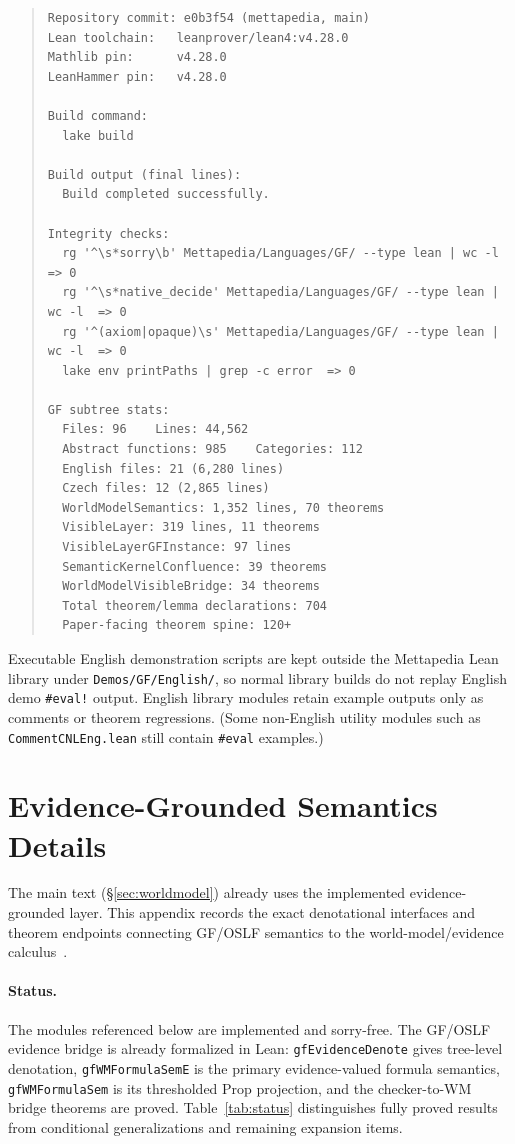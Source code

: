 \documentclass[11pt]{article}
\newcommand{\code}[1]{\texttt{#1}}
\newcommand{\OSLF}{\textup{OSLF}}
\newcommand{\GF}{\textup{GF}}
\begin{document}
\begin{quote}
\small
\begin{verbatim}
Repository commit: e0b3f54 (mettapedia, main)
Lean toolchain:   leanprover/lean4:v4.28.0
Mathlib pin:      v4.28.0
LeanHammer pin:   v4.28.0

Build command:
  lake build

Build output (final lines):
  Build completed successfully.

Integrity checks:
  rg '^\s*sorry\b' Mettapedia/Languages/GF/ --type lean | wc -l  => 0
  rg '^\s*native_decide' Mettapedia/Languages/GF/ --type lean | wc -l  => 0
  rg '^(axiom|opaque)\s' Mettapedia/Languages/GF/ --type lean | wc -l  => 0
  lake env printPaths | grep -c error  => 0

GF subtree stats:
  Files: 96    Lines: 44,562
  Abstract functions: 985    Categories: 112
  English files: 21 (6,280 lines)
  Czech files: 12 (2,865 lines)
  WorldModelSemantics: 1,352 lines, 70 theorems
  VisibleLayer: 319 lines, 11 theorems
  VisibleLayerGFInstance: 97 lines
  SemanticKernelConfluence: 39 theorems
  WorldModelVisibleBridge: 34 theorems
  Total theorem/lemma declarations: 704
  Paper-facing theorem spine: 120+
\end{verbatim}
\end{quote}

\noindent
Executable English demonstration scripts are kept outside the
Mettapedia Lean library under \code{Demos/GF/English/}, so normal
library builds do not replay English demo \code{\#eval!} output.
English library modules retain example outputs only as comments or
theorem regressions.  (Some non-English utility modules such as
\code{CommentCNLEng.lean} still contain \code{\#eval} examples.)

\section{Evidence-Grounded Semantics Details}
\label{app:evidence}
\label{sec:evidence}

The main text (\S\ref{sec:worldmodel}) already uses the implemented
evidence-grounded layer.  This appendix records the exact denotational
interfaces and theorem endpoints connecting \GF{}/\OSLF{} semantics to the
world-model/evidence calculus~\cite{goertzel2009pln}.

\paragraph{Status.}  The modules referenced below are implemented and
sorry-free.  The \GF{}/\OSLF{} evidence bridge is already formalized in Lean:
\code{gfEvidenceDenote} gives tree-level denotation,
\code{gfWMFormulaSemE} is the primary evidence-valued formula semantics,
\code{gfWMFormulaSem} is its thresholded Prop projection, and the checker-to-WM
bridge theorems are proved.  Table~\ref{tab:status} distinguishes fully proved
results from conditional generalizations and remaining expansion items.
\end{document}
